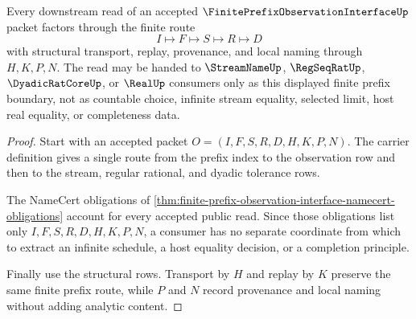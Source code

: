\begin{theorem}
\label{thm:finite-prefix-observation-interface-handoff-boundary}
Every downstream read of an accepted $\FinitePrefixObservationInterfaceUp$ packet factors through the finite route
$$
I \longmapsto F \longmapsto S \longmapsto R \longmapsto D
$$
with structural transport, replay, provenance, and local naming through $H,K,P,N$. The read may be handed to $\StreamNameUp$, $\RegSeqRatUp$, $\DyadicRatCoreUp$, or $\RealUp$ consumers only as this displayed finite prefix boundary, not as countable choice, infinite stream equality, selected limit, host real equality, or completeness data.
\end{theorem}
\begin{proof}
Start with an accepted packet $O=(I,F,S,R,D,H,K,P,N)$. The carrier definition gives a single route from the prefix index to the observation row and then to the stream, regular rational, and dyadic tolerance rows.

The NameCert obligations of \autoref{thm:finite-prefix-observation-interface-namecert-obligations} account for every accepted public read. Since those obligations list only $I,F,S,R,D,H,K,P,N$, a consumer has no separate coordinate from which to extract an infinite schedule, a host equality decision, or a completion principle.

Finally use the structural rows. Transport by $H$ and replay by $K$ preserve the same finite prefix route, while $P$ and $N$ record provenance and local naming without adding analytic content.
\end{proof}




